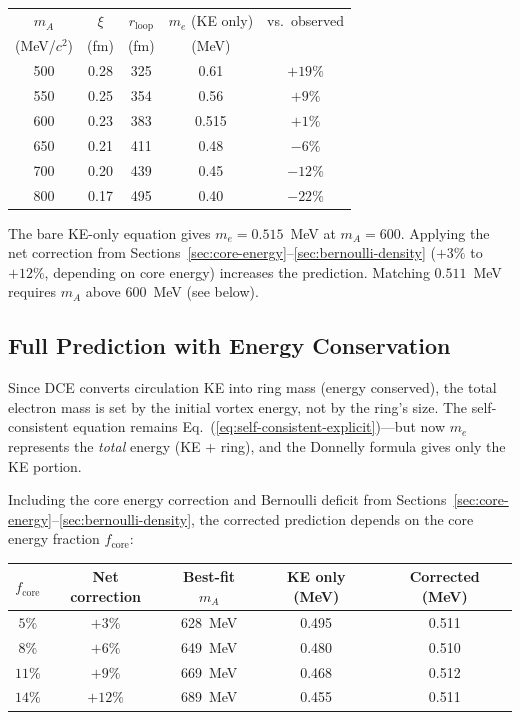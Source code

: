 \documentclass[12pt,letterpaper]{article}
\newcommand{\rloop}{r_{\mathrm{loop}}}
\begin{document}
\medskip
\begin{center}
\begin{tabular}{@{}ccccc@{}}
\toprule
$m_A$ & $\xi$ & $\rloop$ & $m_e$ (KE only) & vs.\ observed \\
(MeV/$c^2$) & (fm) & (fm) & (MeV) & \\
\midrule
500 & 0.28 & 325 & 0.61 & $+19\%$ \\
550 & 0.25 & 354 & 0.56 & $+9\%$ \\
600 & 0.23 & 383 & 0.515 & $+1\%$ \\
650 & 0.21 & 411 & 0.48 & $-6\%$ \\
700 & 0.20 & 439 & 0.45 & $-12\%$ \\
800 & 0.17 & 495 & 0.40 & $-22\%$ \\
\bottomrule
\end{tabular}
\end{center}
\medskip

The bare KE-only equation gives $m_e = 0.515$~MeV at $m_A = 600$.
Applying the net correction from
Sections~\ref{sec:core-energy}--\ref{sec:bernoulli-density} ($+3\%$ to
$+12\%$, depending on core energy) increases the prediction.  Matching
$0.511$~MeV requires $m_A$ above $600$~MeV (see below).

\subsection{Full Prediction with Energy Conservation}

Since DCE converts circulation KE into ring mass (energy conserved),
the total electron mass is set by the initial vortex energy, not by the
ring's size.  The self-consistent equation remains
Eq.~(\ref{eq:self-consistent-explicit})---but now $m_e$ represents the
\emph{total} energy (KE + ring), and the Donnelly formula gives only the
KE portion.

Including the core energy correction and Bernoulli deficit from
Sections~\ref{sec:core-energy}--\ref{sec:bernoulli-density}, the corrected
prediction depends on the core energy fraction $f_{\mathrm{core}}$:

\medskip
\begin{center}
\begin{tabular}{@{}ccccc@{}}
\toprule
$f_{\mathrm{core}}$ & Net correction & Best-fit $m_A$ & KE only (MeV) & Corrected (MeV) \\
\midrule
$5\%$ & $+3\%$ & 628~MeV & 0.495 & 0.511 \\
$8\%$ & $+6\%$ & 649~MeV & 0.480 & 0.510 \\
$11\%$ & $+9\%$ & 669~MeV & 0.468 & 0.512 \\
$14\%$ & $+12\%$ & 689~MeV & 0.455 & 0.511 \\
\bottomrule
\end{tabular}
\end{center}
\medskip
\end{document}
